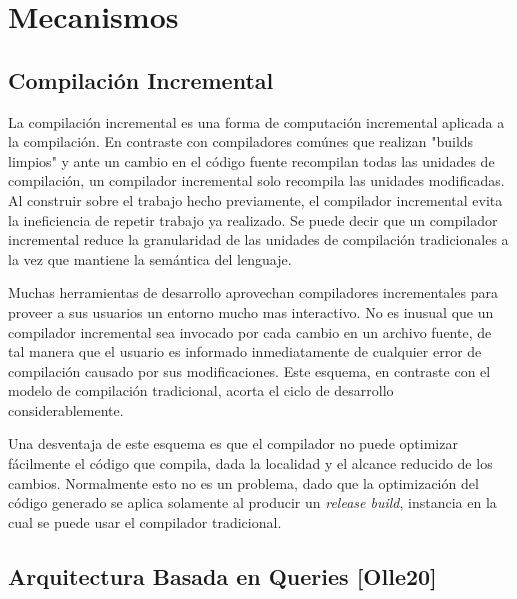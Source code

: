 \documentclass[12pt, a4paper]{report}
\begin{document}
\chapter*{Mecanismos}

\section*{Compilación Incremental}

La compilación incremental es una forma de computación incremental aplicada a la compilación.
En contraste con compiladores comúnes que realizan "builds limpios" y ante un cambio en el código fuente recompilan todas las unidades de compilación, un compilador incremental solo recompila las unidades modificadas.
Al construir sobre el trabajo hecho previamente, el compilador incremental evita la ineficiencia de repetir trabajo ya realizado.
Se puede decir que un compilador incremental reduce la granularidad de las unidades de compilación tradicionales a la vez que mantiene la semántica del lenguaje.
\cite{wiki_incremental_compiler}

Muchas herramientas de desarrollo aprovechan compiladores incrementales para proveer a sus usuarios un entorno mucho mas interactivo.
No es inusual que un compilador incremental sea invocado por cada cambio en un archivo fuente, de tal manera que el usuario es informado inmediatamente de cualquier error de compilación causado por sus modificaciones.
Este esquema, en contraste con el modelo de compilación tradicional, acorta el ciclo de desarrollo considerablemente.
\cite{wiki_incremental_compiler}

Una desventaja de este esquema es que el compilador no puede optimizar fácilmente el código que compila, dada la localidad y el alcance reducido de los cambios.
Normalmente esto no es un problema, dado que la optimización del código generado se aplica solamente al producir un \textit{release build}, instancia en la cual se puede usar el compilador tradicional.
\cite{wiki_incremental_compiler}

\section*{Arquitectura Basada en Queries [Olle20]}

\end{document}
